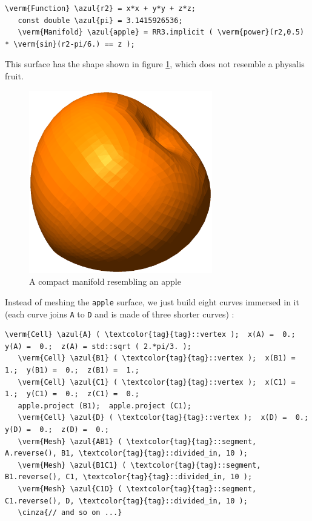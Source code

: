 \begin{Verbatim}[commandchars=\\\{\},formatcom=\small\tt,frame=single,
   label=parag-\ref{\numb section 2.\numb parag 11}.cpp,rulecolor=\color{coment},
   baselinestretch=0.94,framesep=2mm]
   \verm{Function} \azul{r2} = x*x + y*y + z*z;
   const double \azul{pi} = 3.1415926536;
   \verm{Manifold} \azul{apple} = RR3.implicit ( \verm{power}(r2,0.5) * \verm{sin}(r2-pi/6.) == z );
\end{Verbatim}

This surface has the shape shown in figure \ref{\numb section 2.\numb fig 12},
which does not resemble a physalis fruit.

\begin{figure}[ht] \centering
  \includegraphics[width=80mm]{fisalis-manif}
  \caption{A compact manifold resembling an apple}
  \label{\numb section 2.\numb fig 12}
\end{figure}

Instead of meshing the {\small\tt apple} surface, we just build eight curves immersed in it
(each curve joins {\small\tt A} to {\small\tt D} and is made of three shorter curves) :

\begin{Verbatim}[commandchars=\\\{\},formatcom=\small\tt,frame=single,
   label=parag-\ref{\numb section 2.\numb parag 11}.cpp,rulecolor=\color{coment},
   baselinestretch=0.94,framesep=2mm]
   \verm{Cell} \azul{A} ( \textcolor{tag}{tag}::vertex );  x(A) =  0.;  y(A) =  0.;  z(A) = std::sqrt ( 2.*pi/3. );
   \verm{Cell} \azul{B1} ( \textcolor{tag}{tag}::vertex );  x(B1) =  1.;  y(B1) =  0.;  z(B1) =  1.;
   \verm{Cell} \azul{C1} ( \textcolor{tag}{tag}::vertex );  x(C1) =  1.;  y(C1) =  0.;  z(C1) =  0.;
   apple.project (B1);  apple.project (C1);
   \verm{Cell} \azul{D} ( \textcolor{tag}{tag}::vertex );  x(D) =  0.;  y(D) =  0.;  z(D) =  0.;
   \verm{Mesh} \azul{AB1} ( \textcolor{tag}{tag}::segment, A.reverse(), B1, \textcolor{tag}{tag}::divided_in, 10 );
   \verm{Mesh} \azul{B1C1} ( \textcolor{tag}{tag}::segment, B1.reverse(), C1, \textcolor{tag}{tag}::divided_in, 10 );
   \verm{Mesh} \azul{C1D} ( \textcolor{tag}{tag}::segment, C1.reverse(), D, \textcolor{tag}{tag}::divided_in, 10 );
   \cinza{// and so on ...}
\end{Verbatim}

